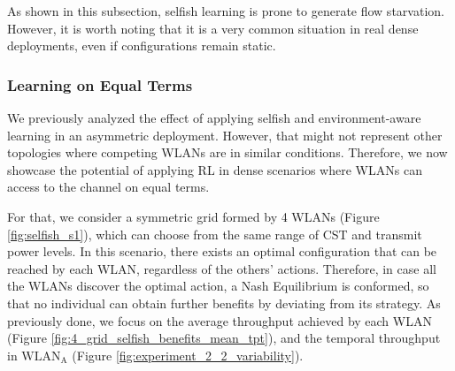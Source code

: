 \documentclass{article}
\begin{document}
As shown in this subsection, selfish learning is prone to generate flow starvation. However, it is worth noting that it is a very common situation in real dense deployments, even if configurations remain static.

\subsubsection{Learning on Equal Terms}
\label{subsubsection:resources_maximization}

We previously analyzed the effect of applying selfish and environment-aware learning in an asymmetric deployment. However, that might not represent other topologies where competing WLANs are in similar conditions. Therefore, we now showcase the potential of applying RL in dense scenarios where WLANs can access to the channel on equal terms. 

For that, we consider a symmetric grid formed by 4 WLANs (Figure \ref{fig:selfish_s1}), which can choose from the same range of CST and transmit power levels. In this scenario, there exists an optimal configuration that can be reached by each WLAN, regardless of the others' actions. Therefore, in case all the WLANs discover the optimal action, a Nash Equilibrium is conformed, so that no individual can obtain further benefits by deviating from its strategy. As previously done, we focus on the average throughput achieved by each WLAN (Figure \ref{fig:4_grid_selfish_benefits_mean_tpt}), and the temporal throughput in $\text{WLAN}_\text{A}$ (Figure \ref{fig:experiment_2_2_variability}).
\end{document}
